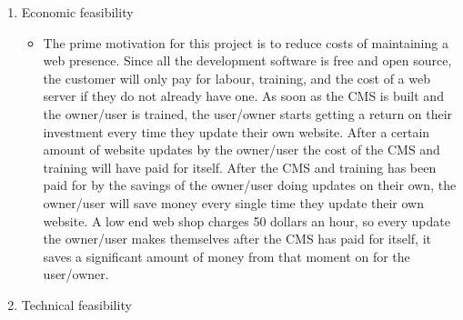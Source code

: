 \documentclass[11pt]{article}
\begin{document}
\begin{enumerate}
    \item Economic feasibility
    
    \begin{itemize}
    \item The prime motivation for this project is to reduce costs of maintaining a web presence. Since all the development software is free and open source, the customer will only pay for labour, training, and the cost of a web server if they do not already have one. As soon as the CMS is built and the owner/user is trained, the user/owner starts getting a return on their investment every time they update their own website. After a certain amount of website updates by the owner/user the cost of the CMS and training will have paid for itself. After the CMS and training has been paid for by the savings of the owner/user doing updates on their own, the owner/user will save money every single time they update their own website. A low end web shop charges 50 dollars an hour, so every update the owner/user makes themselves after the CMS has paid for itself, it saves a significant amount of money from that moment on for the user/owner.  
    \end{itemize}
    
    \item Technical feasibility
    

\end{enumerate}
\end{document}
